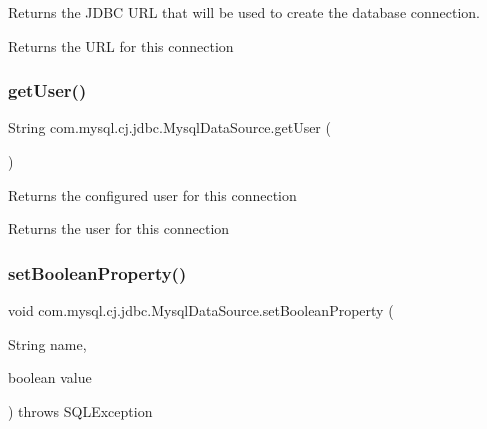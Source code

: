 Returns the J\+D\+BC U\+RL that will be used to create the database connection.

\begin{DoxyReturn}{Returns}
the U\+RL for this connection 
\end{DoxyReturn}
\mbox{\label{classcom_1_1mysql_1_1cj_1_1jdbc_1_1_mysql_data_source_a22e84365059e1c1e6e29c9999a31d6b0}} 
\subsubsection{\texorpdfstring{get\+User()}{getUser()}}
{\footnotesize\ttfamily String com.\+mysql.\+cj.\+jdbc.\+Mysql\+Data\+Source.\+get\+User (\begin{DoxyParamCaption}{ }\end{DoxyParamCaption})}

Returns the configured user for this connection

\begin{DoxyReturn}{Returns}
the user for this connection 
\end{DoxyReturn}
\mbox{\label{classcom_1_1mysql_1_1cj_1_1jdbc_1_1_mysql_data_source_adc84490058d4bd47e16af04970d934a0}} 
\subsubsection{\texorpdfstring{set\+Boolean\+Property()}{setBooleanProperty()}}
{\footnotesize\ttfamily void com.\+mysql.\+cj.\+jdbc.\+Mysql\+Data\+Source.\+set\+Boolean\+Property (\begin{DoxyParamCaption}\item[{String}]{name,  }\item[{boolean}]{value }\end{DoxyParamCaption}) throws S\+Q\+L\+Exception\hspace{0.3cm}{\ttfamily [protected]}}

